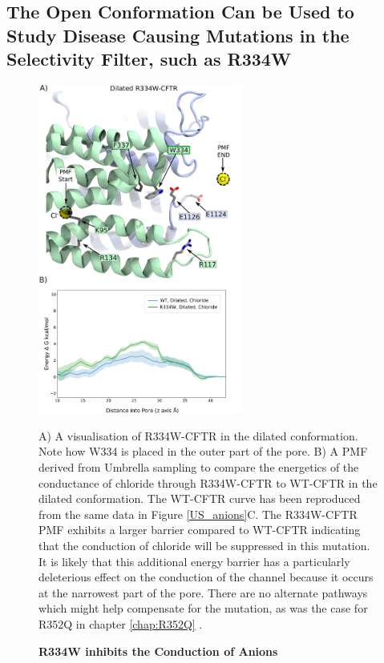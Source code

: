 \subsection{The Open Conformation Can be Used to Study Disease Causing Mutations in the Selectivity Filter, such as R334W}


\begin{figure}
	\begin{center}
		\includegraphics[width=0.6\textwidth]{figures/opening/R334W_pmf_combined.pdf}
	\end{center}
	\captionsetup{singlelinecheck = false, justification=raggedright}
	\caption[R334W Inhibits the Conduction of Anions] {\textbf{R334W inhibits the Conduction of Anions}}{A) A visualisation of R334W-CFTR in the dilated conformation. Note how W334 is placed in the outer part of the pore. B) A PMF derived from Umbrella sampling to compare the energetics of the conductance of chloride through R334W-CFTR to WT-CFTR in the dilated conformation. The WT-CFTR curve has been reproduced from the same data in Figure \ref{US_anions}C. The R334W-CFTR PMF exhibits a larger barrier compared to WT-CFTR indicating that the conduction of chloride will be suppressed in this mutation. It is likely that this additional energy barrier has a particularly deleterious effect on the conduction of the channel because it occurs at the narrowest part of the pore. There are no alternate pathways which might help compensate for the mutation, as was the case for R352Q in chapter \ref{chap:R352Q} \cite{wong2022a}.  }
	\label{R334_pmf}
\end{figure}

